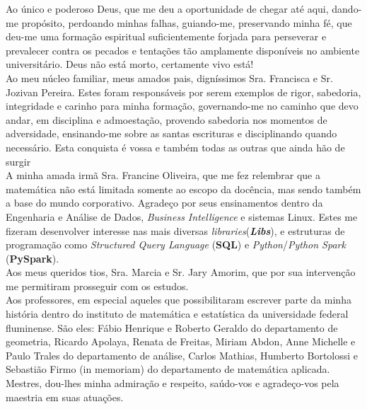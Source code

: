 
\begin{agradecimentos}
	
\noindent
Ao único e poderoso Deus, que me deu a oportunidade de chegar até aqui, dando-me propósito, perdoando minhas falhas, guiando-me, preservando minha fé, que deu-me uma formação espiritual suficientemente forjada para perseverar e prevalecer contra os pecados e tentações tão amplamente disponíveis no ambiente universitário. Deus não está morto, certamente vivo está!\\

\noindent
Ao meu núcleo familiar, meus amados pais, digníssimos Sra. Francisca e Sr. Jozivan Pereira. Estes foram responsáveis por serem exemplos de rigor, sabedoria, integridade e carinho para minha formação, governando-me no caminho que devo andar, em disciplina e admoestação, provendo sabedoria nos momentos de adversidade, ensinando-me sobre as santas escrituras e disciplinando quando necessário. Esta conquista é vossa e também todas as outras que ainda hão de surgir \heart \\

\noindent
A minha amada irmã Sra. Francine Oliveira, que me fez relembrar que a matemática não está limitada somente ao escopo da docência, mas sendo também a base do mundo corporativo. Agradeço por seus ensinamentos dentro da Engenharia e Análise de Dados, \textit{Business Intelligence} e sistemas Linux. Estes me fizeram desenvolver interesse nas mais diversas \textit{libraries}(\textbf{\textit{Libs}}), e estruturas de programação como \textit{Structured Query Language} (\textbf{SQL}) e \textit{Python}/\textit{Python Spark} (\textbf{PySpark}).  \\

\noindent
Aos meus queridos tios, Sra. Marcia e Sr. Jary Amorim, que por sua intervenção me permitiram prosseguir com os estudos. \\

\noindent
Aos professores, em especial aqueles que possibilitaram escrever parte da minha história dentro do instituto de matemática e estatística da universidade federal fluminense. São eles: Fábio Henrique e Roberto Geraldo do departamento de geometria, Ricardo Apolaya, Renata de Freitas, Miriam Abdon, Anne Michelle e Paulo Trales do departamento de análise, Carlos Mathias, Humberto Bortolossi e Sebastião Firmo (in memoriam) do departamento de matemática aplicada. Mestres, dou-lhes minha admiração e respeito, saúdo-vos e agradeço-vos pela maestria em suas atuações. \\


\end{agradecimentos}
